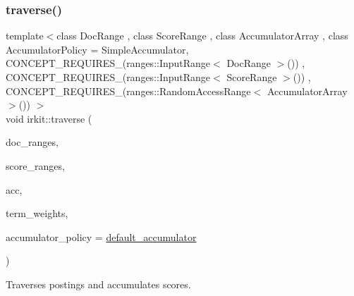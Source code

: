 \mbox{\label{namespaceirkit_a72c284d98cc7a897b52dd197bdf8ee47}} 
\subsubsection{\texorpdfstring{traverse()}{traverse()}}
{\footnotesize\ttfamily template$<$class Doc\+Range , class Score\+Range , class Accumulator\+Array , class Accumulator\+Policy  = Simple\+Accumulator, C\+O\+N\+C\+E\+P\+T\+\_\+\+R\+E\+Q\+U\+I\+R\+E\+S\+\_\+(ranges\+::\+Input\+Range$<$ Doc\+Range $>$()) , C\+O\+N\+C\+E\+P\+T\+\_\+\+R\+E\+Q\+U\+I\+R\+E\+S\+\_\+(ranges\+::\+Input\+Range$<$ Score\+Range $>$()) , C\+O\+N\+C\+E\+P\+T\+\_\+\+R\+E\+Q\+U\+I\+R\+E\+S\+\_\+(ranges\+::\+Random\+Access\+Range$<$ Accumulator\+Array $>$()) $>$ \\
void irkit\+::traverse (\begin{DoxyParamCaption}\item[{const std\+::vector$<$ Doc\+Range $>$ \&}]{doc\+\_\+ranges,  }\item[{const std\+::vector$<$ Score\+Range $>$ \&}]{score\+\_\+ranges,  }\item[{Accumulator\+Array \&}]{acc,  }\item[{const std\+::vector$<$ \hyperlink{namespaceirkit_afcffab67300c5c703cb38a363c9a6f1d}{pure\+\_\+element\+\_\+t}$<$ Score\+Range $>$$>$ \&}]{term\+\_\+weights,  }\item[{Accumulator\+Policy \&}]{accumulator\+\_\+policy = {\ttfamily \hyperlink{namespaceirkit_a823671564bf545991e9708011e4a8df1}{default\+\_\+accumulator}} }\end{DoxyParamCaption})}



Traverses postings and accumulates scores. 

\mbox{\label{namespaceirkit_a4c79a79ea1508257bcf4eaaf615e2f9a}} 
